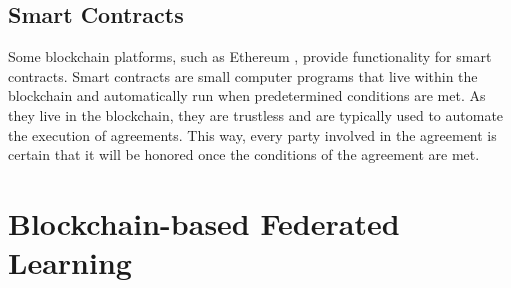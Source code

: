 \subsection{Smart Contracts}

Some blockchain platforms, such as Ethereum \cite{wood2014ethereum}, provide functionality for smart contracts. Smart contracts are small computer programs that live within the blockchain and automatically run when predetermined conditions are met. As they live in the blockchain, they are trustless and are typically used to automate the execution of agreements. This way, every party involved in the agreement is certain that it will be honored once the conditions of the agreement are met.

\section{Blockchain-based Federated Learning}\label{fundamentals:blockchain}

